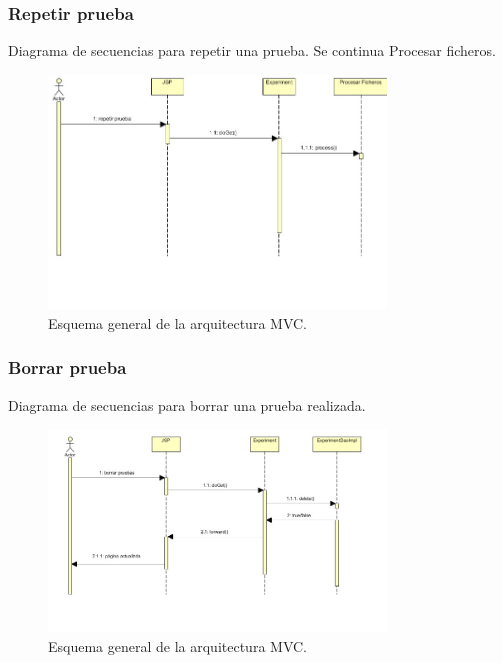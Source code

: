 \subsubsection{Repetir prueba}
Diagrama de secuencias para repetir una prueba. Se continua Procesar ficheros.
\begin{figure}[!htbp]
  \centering
    \includegraphics[width=0.8\textwidth]{../img/diagramas/secuencias/13.jpg}
  \caption{Esquema general de la arquitectura MVC.}
  \label{mvc}
\end{figure}

\subsubsection{Borrar prueba}
Diagrama de secuencias para borrar una prueba realizada.
\begin{figure}[!htbp]
  \centering
    \includegraphics[width=0.8\textwidth]{../img/diagramas/secuencias/12.jpg}
  \caption{Esquema general de la arquitectura MVC.}
  \label{mvc}
\end{figure}

